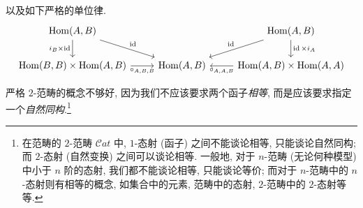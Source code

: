 \begin{definition}
\[\begin{tikzcd}[ampersand replacement=\&]
	\end{tikzcd}\]
	以及如下严格的单位律.
	\[\begin{tikzcd}[ampersand replacement=\&]
		{\operatorname{Hom}(A,B)} \&\& {\operatorname{Hom}(A,B)} \\
		{\operatorname{Hom}(B,B)\times\operatorname{Hom}(A,B)} \& {\operatorname{Hom}(A,B)} \& {\operatorname{Hom}(A,B)\times\operatorname{Hom}(A,A)}
		\arrow["{\operatorname{id}}", from=1-1, to=2-2]
		\arrow["{i_B\times \operatorname{id}}"', from=1-1, to=2-1]
		\arrow["{\circ_{A,B,B}}"', from=2-1, to=2-2]
		\arrow["{\circ_{A,A,B}}", from=2-3, to=2-2]
		\arrow["{\operatorname{id}}"', from=1-3, to=2-2]
		\arrow["{\operatorname{id}\times i_A}", from=1-3, to=2-3]
	\end{tikzcd}\]
\end{definition}

严格 $2$-范畴的概念不够好, 因为我们不应该要求两个函子\emph{相等}, 而是应该要求指定一个\emph{自然同构}.\footnote{在范畴的 $2$-范畴 $\mathcal Cat$ 中, $1$-态射 (函子) 之间不能谈论相等, 只能谈论自然同构; 而 $2$-态射 (自然变换) 之间可以谈论相等. 一般地, 对于 $n$-范畴 (无论何种模型) 中小于 $n$ 阶的态射, 我们都不能谈论相等, 只能谈论等价; 而对于 $n$-范畴中的 $n$-态射则有相等的概念, 如集合中的元素, 范畴中的态射, $2$-范畴中的 $2$-态射等等.}

